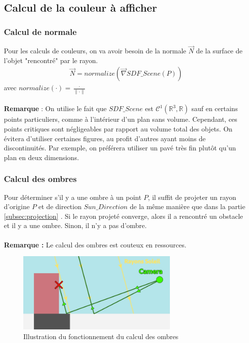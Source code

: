 \newpage
\subsection{Calcul de la couleur à afficher}
\subsubsection{Calcul de normale}
Pour les calculs de couleurs, on va avoir besoin de la normale $\Vec{N}$ de la surface de l'objet "rencontré" par le rayon.
\begin{align*}
    \Vec{N}=normalize(\Vec{\nabla}SDF\_Scene(P))
\end{align*}
avec $normalize(\cdot )=\frac{\cdot }{\|\cdot \|}$\\
\\
\textbf{Remarque} : On utilise le fait que $SDF\_Scene$ est $\mathcal{C}^1(\mathbb{R}^3,\mathbb{R})$ sauf en certains points particuliers, comme à l'intérieur d'un plan sans volume. Cependant, ces points critiques sont négligeables par rapport au volume total des objets. On évitera d'utiliser certaines figures, au profit d'autres ayant moins de discontinuités. Par exemple, on préférera utiliser un pavé très fin plutôt qu'un plan en deux dimensions.

\subsubsection{Calcul des ombres}
Pour déterminer s'il y a une ombre à un point $P$, il suffit de projeter un rayon d'origine $P$ et de direction $Sun\_Direction$ de la même manière que dans la partie \ref{subsec:projection} . Si le rayon projeté converge, alors il a rencontré un obstacle et il y a une ombre. Sinon, il n'y a pas d'ombre.\\
\\\textbf{Remarque :} Le calcul des ombres est couteux en ressources.

\begin{figure}[h]
    \centering
    \includegraphics[width=8cm]{images/ombres.jpg}
    \caption{Illustration du fonctionnement du calcul des ombres}
    \label{fig:ombres}
\end{figure}

